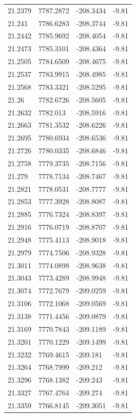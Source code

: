 \begin{table}[H]
\begin{tabular}{llll}
21.2379 & 7787.2872 & -208.3434 & -9.81 \\
21.241 & 7786.6283 & -208.3744 & -9.81 \\
21.2442 & 7785.9692 & -208.4054 & -9.81 \\
21.2473 & 7785.3101 & -208.4364 & -9.81 \\
21.2505 & 7784.6509 & -208.4675 & -9.81 \\
21.2537 & 7783.9915 & -208.4985 & -9.81 \\
21.2568 & 7783.3321 & -208.5295 & -9.81 \\
21.26 & 7782.6726 & -208.5605 & -9.81 \\
21.2632 & 7782.013 & -208.5916 & -9.81 \\
21.2663 & 7781.3532 & -208.6226 & -9.81 \\
21.2695 & 7780.6934 & -208.6536 & -9.81 \\
21.2726 & 7780.0335 & -208.6846 & -9.81 \\
21.2758 & 7779.3735 & -208.7156 & -9.81 \\
21.279 & 7778.7134 & -208.7467 & -9.81 \\
21.2821 & 7778.0531 & -208.7777 & -9.81 \\
21.2853 & 7777.3928 & -208.8087 & -9.81 \\
21.2885 & 7776.7324 & -208.8397 & -9.81 \\
21.2916 & 7776.0719 & -208.8707 & -9.81 \\
21.2948 & 7775.4113 & -208.9018 & -9.81 \\
21.2979 & 7774.7506 & -208.9328 & -9.81 \\
21.3011 & 7774.0898 & -208.9638 & -9.81 \\
21.3043 & 7773.4289 & -208.9948 & -9.81 \\
21.3074 & 7772.7679 & -209.0259 & -9.81 \\
21.3106 & 7772.1068 & -209.0569 & -9.81 \\
21.3138 & 7771.4456 & -209.0879 & -9.81 \\
21.3169 & 7770.7843 & -209.1189 & -9.81 \\
21.3201 & 7770.1229 & -209.1499 & -9.81 \\
21.3232 & 7769.4615 & -209.181 & -9.81 \\
21.3264 & 7768.7999 & -209.212 & -9.81 \\
21.3296 & 7768.1382 & -209.243 & -9.81 \\
21.3327 & 7767.4764 & -209.274 & -9.81 \\
21.3359 & 7766.8145 & -209.3051 & -9.81 \\

\end{tabular}
\end{table}
